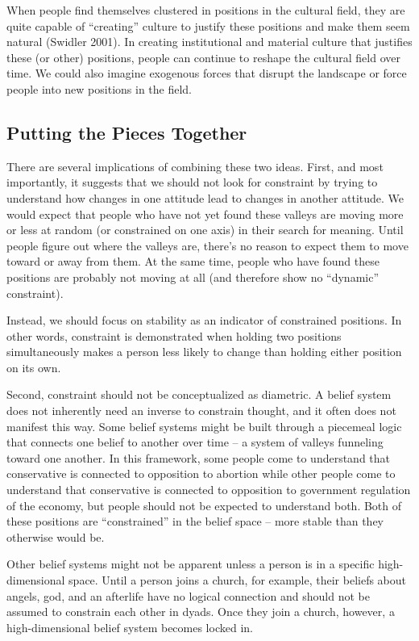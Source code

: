\documentclass[12pt,]{article}
\begin{document}
When people find themselves clustered in positions in the cultural field, they are quite capable of ``creating'' culture to justify these positions and make them seem natural (Swidler 2001). In creating institutional and material culture that justifies these (or other) positions, people can continue to reshape the cultural field over time. We could also imagine exogenous forces that disrupt the landscape or force people into new positions in the field.

\hypertarget{putting-the-pieces-together}{%
\subsection{Putting the Pieces Together}\label{putting-the-pieces-together}}

There are several implications of combining these two ideas. First, and most importantly, it suggests that we should not look for constraint by trying to understand how changes in one attitude lead to changes in another attitude. We would expect that people who have not yet found these valleys are moving more or less at random (or constrained on one axis) in their search for meaning. Until people figure out where the valleys are, there's no reason to expect them to move toward or away from them. At the same time, people who have found these positions are probably not moving at all (and therefore show no ``dynamic'' constraint).

Instead, we should focus on stability as an indicator of constrained positions. In other words, constraint is demonstrated when holding two positions simultaneously makes a person less likely to change than holding either position on its own.

Second, constraint should not be conceptualized as diametric. A belief system does not inherently need an inverse to constrain thought, and it often does not manifest this way. Some belief systems might be built through a piecemeal logic that connects one belief to another over time -- a system of valleys funneling toward one another. In this framework, some people come to understand that conservative is connected to opposition to abortion while other people come to understand that conservative is connected to opposition to government regulation of the economy, but people should not be expected to understand both. Both of these positions are ``constrained'' in the belief space -- more stable than they otherwise would be.

Other belief systems might not be apparent unless a person is in a specific high-dimensional space. Until a person joins a church, for example, their beliefs about angels, god, and an afterlife have no logical connection and should not be assumed to constrain each other in dyads. Once they join a church, however, a high-dimensional belief system becomes locked in.
\end{document}
